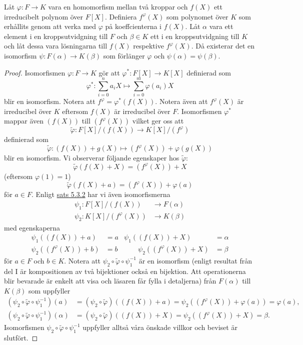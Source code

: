 \documentclass{article}
\theoremstyle{definition}
\begin{document}
\hypertarget{6.0.2}{}
\begin{mylemma}{}{}
  Låt $\varphi: F \rightarrow K$ vara en homomorfism mellan två kroppar och $f(X)$ ett irreducibelt polynom över $F[X]$. Definiera $f^{\varphi}(X)$
  som polynomet över $K$ som erhållits genom att verka med $\varphi$ på koeffcienterna i $f(X)$. Låt $\alpha$ vara ett element i en kroppsutvidgning till $F$
  och $\beta \in K$ ett i en kroppsutvidgning till $K$ och låt dessa vara lösningarna till
  $f(X)$ respektive $f^{\varphi}(X)$. Då existerar det en isomorfism $\psi:F(\alpha) \rightarrow K(\beta)$ 
  som förlänger $\varphi$ och $\psi(\alpha) = \psi(\beta).$
\end{mylemma}

\begin{proof}
  Isomorfismen $\varphi: F \rightarrow K$ gör att $\varphi^*: F[X] \rightarrow K[X]$ definierad som 
  \[\varphi^*: \sum_{i = 0}^n a_iX \mapsto \sum_{i = 0}^m \varphi(a_i)X\]
  blir en isomorfism. Notera att $f^{\varphi} = \varphi^*(f(X)).$ Notera även att $f^{\varphi}(X)$ är irreducibel över $K$ eftersom $f(X)$ är irreducibel över $F$.
  Isomorfismen $\varphi^*$ mappar även $(f(X))$ till $(f^{\varphi}(X))$ vilket ger oss att
  \[\tilde{\varphi}: F[X]/(f(X)) \rightarrow K[X]/(f^{\varphi})\]
  definierad som 
  \[\tilde{\varphi}: (f(X)) + g(X) \mapsto (f^{\varphi}(X)) + \varphi(g(X))\]
  blir en isomorfism. Vi observerar följande egenskaper hos $\tilde{\varphi}$:
  \[\tilde{\varphi}(f(X) + X) = (f^{\varphi}(X)) + X\]
  (eftersom $\varphi(1) = 1$)
  \[\tilde{\varphi}(f(X) + a) = (f^{\varphi}(X)) + \varphi(a)\]
  för $a \in F$. Enligt \hyperlink{5.3.2}{sats 5.3.2} har vi även isomorfismerna 
  \begin{align*}
    \psi_1: F[X]/(f(X)) &\rightarrow F(\alpha) \\
    \psi_2: K[X]/(f^{\varphi}(X)) &\rightarrow K(\beta)
  \end{align*}
  med egenskaperna
  \begin{align*}
    \psi_1((f(X)) + a) &= a           & \psi_1((f(X)) + X) &= \alpha \\
    \psi_2((f^{\varphi}(X)) + b) &= b & \qquad \psi_2((f^{\varphi}(X)) + X) &= \beta
  \end{align*}
  för $a \in F$ och $b \in K.$ Notera att $\psi_2 \circ \tilde{\varphi} \circ \psi_1^{-1}$ är en isomorfism (enligt resultat från del I är 
  kompositionen av två bijektioner också en bijektion. Att operationerna blir bevarade är enkelt att visa och läsaren får fylla i detaljerna)
  från $F(\alpha)$ till $K(\beta)$ som uppfyller 
  \begin{align*}
    (\psi_2 \circ \tilde{\varphi} \circ \psi_1^{-1}) (a) &= (\psi_2 \circ \tilde{\varphi}) ( (f(X)) + a) = \psi_2 ((f^{\varphi}(X)) + \varphi(a)) = \varphi(a), \\
    (\psi_2 \circ \tilde{\varphi} \circ \psi_1^{-1}) (\alpha) &= (\psi_2 \circ \tilde{\varphi}) ((f(X)) + X) = \psi_2((f^{\varphi}(X)) + X) = \beta.
  \end{align*}
  Isomorfismen $\psi_2 \circ \tilde{\varphi} \circ \psi_1^{-1}$ uppfyller alltså våra önskade villkor och beviset är slutfört.
\end{proof}
\end{document}
